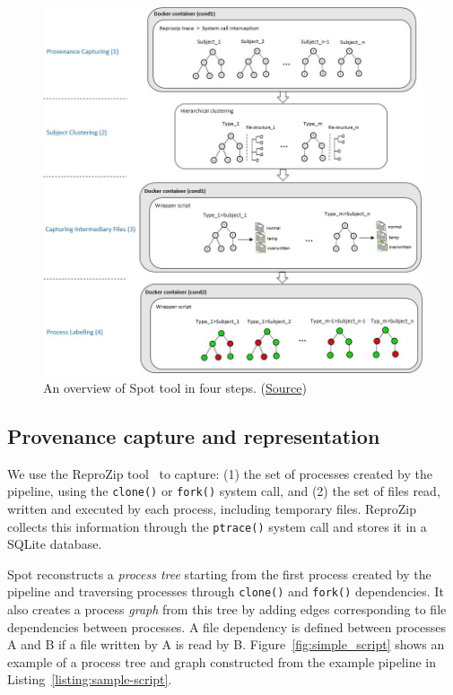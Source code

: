 \documentclass[a4paper,num-refs]{oup-contemporary}
\newcommand{\reprozip}[0]{ReproZip\xspace}
\newcommand{\toolname}[0]{Spot\xspace}
\begin{document}
\begin{figure}
  \centering
    \includegraphics[width=1\columnwidth]{images/overview-fig}
    \caption{An overview of Spot tool in four steps.
    (\href{https://encsconcordiaca-my.sharepoint.com/:p:/g/personal/m_alari_encs_concordia_ca/EYx_aIZgYKlDuuXKPKi5ckIBo_WmJeE1Czr9rqG4gLHOOA?e=H8gack}{Source})}
    \label{fig:overview-tool}
  \end{figure}


\subsection{Provenance capture and representation}

We use the \reprozip tool~\cite{rampin2016reprozip}
to capture: (1) the set of processes created by the
pipeline, using the \texttt{clone()} or \texttt{fork()} system call, and
(2) the set of files read, written and executed by each process, including
temporary files. \reprozip collects this information through the
\texttt{ptrace()} system call and stores it in a SQLite database.

\toolname reconstructs a \emph{process tree} starting from the first process
created by the pipeline and traversing processes through \texttt{clone()}
and \texttt{fork()} dependencies. It also creates a process \emph{graph} 
from this tree by adding edges corresponding to file dependencies between processes. A
file dependency is defined between processes A and B if a file written by A
is read by B. Figure~\ref{fig:simple_script} shows an example of a process
tree and graph constructed from the example pipeline in
Listing~\ref{listing:sample-script}.
\end{document}
